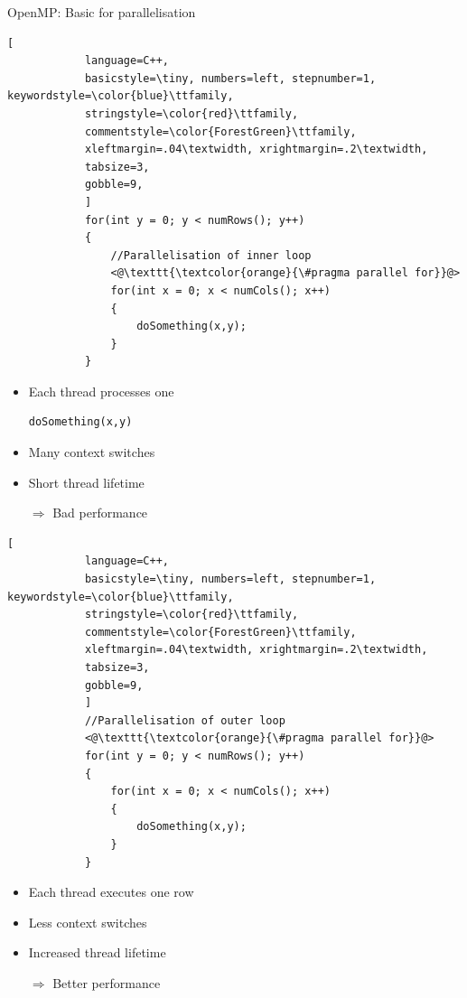 \documentclass[shortpres,usenames,dvipsnames]{beamer}
\begin{document}
\begin{frame}[containsverbatim]{OpenMP: Basic for parallelisation}
	\begin{multicols}{2}
		\begin{lstlisting}[
			language=C++,
			basicstyle=\tiny, numbers=left, stepnumber=1, keywordstyle=\color{blue}\ttfamily,
			stringstyle=\color{red}\ttfamily,
			commentstyle=\color{ForestGreen}\ttfamily,
			xleftmargin=.04\textwidth, xrightmargin=.2\textwidth,
			tabsize=3,
			gobble=9,
			]
			for(int y = 0; y < numRows(); y++)
			{
				//Parallelisation of inner loop
				<@\texttt{\textcolor{orange}{\#pragma parallel for}}@>
				for(int x = 0; x < numCols(); x++)
				{
					doSomething(x,y);
				}
			}
		\end{lstlisting}
			
		\begin{itemize}
			\item Each thread processes one \begin{verbatim}doSomething(x,y)\end{verbatim}
			\item Many context switches
			\item Short thread lifetime
			\item[$\Rightarrow$] Bad performance 
		\end{itemize}
		
	\columnbreak
	
		\begin{lstlisting}[
			language=C++,
			basicstyle=\tiny, numbers=left, stepnumber=1, keywordstyle=\color{blue}\ttfamily,
			stringstyle=\color{red}\ttfamily,
			commentstyle=\color{ForestGreen}\ttfamily,
			xleftmargin=.04\textwidth, xrightmargin=.2\textwidth,
			tabsize=3,
			gobble=9,
			]
			//Parallelisation of outer loop
			<@\texttt{\textcolor{orange}{\#pragma parallel for}}@>
			for(int y = 0; y < numRows(); y++)
			{
				for(int x = 0; x < numCols(); x++)
				{
					doSomething(x,y);
				}
			}
		\end{lstlisting}
		
		\begin{itemize}
			\item Each thread executes one row
			\item Less context switches
			\item Increased thread lifetime
			\item[$\Rightarrow$] Better performance
		\end{itemize}
	\end{multicols}
\end{frame}
\end{document}
